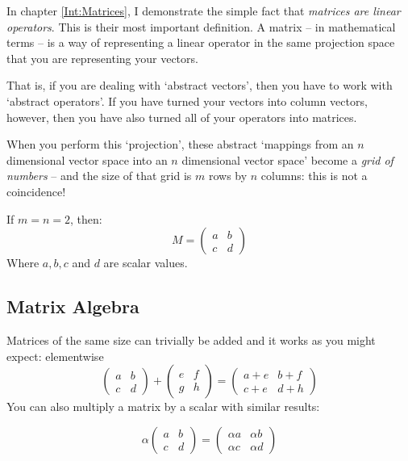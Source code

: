\documentclass[a4paper,openany,11pt]{book}
\begin{document}
				In chapter \ref{Int:Matrices}, I demonstrate the simple fact that \textit{matrices are linear operators}. This is their most important definition. A matrix -- in mathematical terms -- is a way of representing a linear operator in the same projection space that you are representing your vectors. 

				That is, if you are dealing with `abstract vectors', then you have to work with `abstract operators'. If you have turned your vectors into column vectors, however, then you have also turned all of your operators into matrices. 

				When you perform this `projection', these abstract `mappings from an $n$ dimensional vector space into an $n$ dimensional vector space' become a \textit{grid of numbers} -- and the size of that grid is $m$ rows by $n$ columns: this is not a coincidence!

				If $m = n = 2$, then:
				\begin{equation}
					M = \begin{pmatrix}
						a & b \\ c & d
					\end{pmatrix}
				\end{equation}
				Where $a, b, c $ and $d$ are scalar values. 

				\subsection{Matrix Algebra}

					Matrices of the same size can trivially be added and it works as you might expect: elementwise
					\begin{equation}
						\begin{pmatrix}
							a & b \\ c & d
						\end{pmatrix} + \begin{pmatrix}
							e & f \\ g & h
						\end{pmatrix} = \begin{pmatrix}
							a+e & b+f \\ c+e & d+h
						\end{pmatrix}
					\end{equation}
					You can also multiply a matrix by a scalar with similar results:

					\begin{equation}
						\alpha \begin{pmatrix}
							a & b \\ c & d
						\end{pmatrix} = \begin{pmatrix}
							\alpha a & \alpha b \\ \alpha c & \alpha d
						\end{pmatrix}
					\end{equation}
\end{document}
